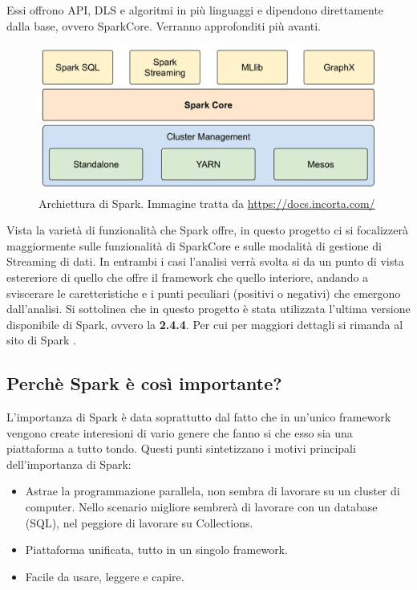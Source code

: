 \documentclass[12pt,italian]{article}
\begin{document}
Essi offrono API, DLS e algoritmi in più linguaggi e dipendono direttamente dalla base, ovvero SparkCore. Verranno approfonditi più avanti.
\begin{figure}[H]
	\centering 
	\includegraphics[width=0.8\linewidth]{img/sparkModules.png}
	\caption{Archiettura di Spark. Immagine tratta da \url{https://docs.incorta.com/}}
	\label{fig:SparkModules}
\end{figure}
\par Vista la varietà di funzionalità che Spark offre, in questo progetto ci si focalizzerà maggiormente sulle funzionalità di SparkCore e sulle modalità di gestione di Streaming di dati. In entrambi i casi l'analisi verrà svolta si da un punto di vista estereriore di quello che offre il framework che quello interiore, andando a sviscerare le caretteristiche e i punti peculiari (positivi o negativi) che emergono dall'analisi. 
\newline
Si sottolinea che in questo progetto è stata utilizzata l'ultima versione disponibile di Spark, ovvero la \textbf{2.4.4}. Per cui per maggiori dettagli si rimanda al sito di Spark \cite{spark}.
\subsection{Perchè Spark è così importante?}
L'importanza di Spark è data soprattutto dal fatto che in un'unico framework vengono create interesioni di vario genere che fanno si che esso sia una piattaforma a tutto tondo. Questi punti sintetizzano i motivi principali dell'importanza di Spark:
\begin{itemize}
	\item Astrae la programmazione parallela, non sembra di lavorare su un cluster di computer.
	Nello scenario migliore sembrerà di lavorare con un database (SQL), nel peggiore di lavorare su Collections.
	\item Piattaforma unificata, tutto in un singolo framework.
	\item Facile da usare, leggere e capire.
\end{itemize}
\end{document}
